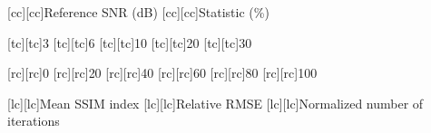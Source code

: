[cc][cc]{\footnotesize Reference \acs{SNR} (\si{\deci\bel})}
[cc][cc]{\footnotesize Statistic (\si{\percent})}

[tc][tc]{\scriptsize 3}
[tc][tc]{\scriptsize 6}
[tc][tc]{\scriptsize 10}
[tc][tc]{\scriptsize 20}
[tc][tc]{\scriptsize 30}

[rc][rc]{\scriptsize 0}
[rc][rc]{\scriptsize 20}
[rc][rc]{\scriptsize 40}
[rc][rc]{\scriptsize 60}
[rc][rc]{\scriptsize 80}
[rc][rc]{\scriptsize 100}

[lc][lc]{\footnotesize Mean \acs{SSIM} index}
[lc][lc]{\footnotesize Relative \acs{RMSE}}
[lc][lc]{\footnotesize Normalized number of iterations}


